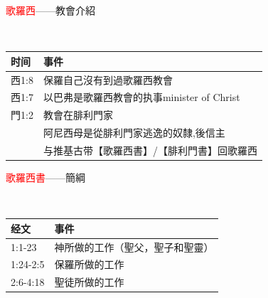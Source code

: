 \documentclass{beamer}
\begin{document}
\begin{frame}{\textcolor{red}{歌羅西}——教會介紹}
\begin{block}{}\\
\begin{table}
\centering
\begin{tabular}{l|l}
时间 & 事件 \\\hline\hline
西1:8&保羅自己沒有到過歌羅西教會 \\\hline\hline
西1:7&以巴弗是歌羅西教會的执事minister of Christ \\\hline
門1:2&教會在腓利門家\\
&阿尼西母是從腓利門家逃逸的奴隸,後信主\\
&与推基古带【歌羅西書】/【腓利門書】回歌羅西\\\hline\hline
\end{tabular}
\end{table}
\end{block}
\end{frame}

\begin{frame}{\textcolor{red}{歌羅西書}——簡綱}
\begin{block}{}\\
\begin{table}
\hspace{-1.cm}
\begin{tabular}{l|l}
经文& 事件\\\hline
1:1-23&神所做的工作（聖父，聖子和聖靈）\\
1:24-2:5&保羅所做的工作\\
2:6-4:18&聖徒所做的工作\\\hline\hline
\end{tabular}
\end{table}
\end{block}
\end{frame}
\end{document}
